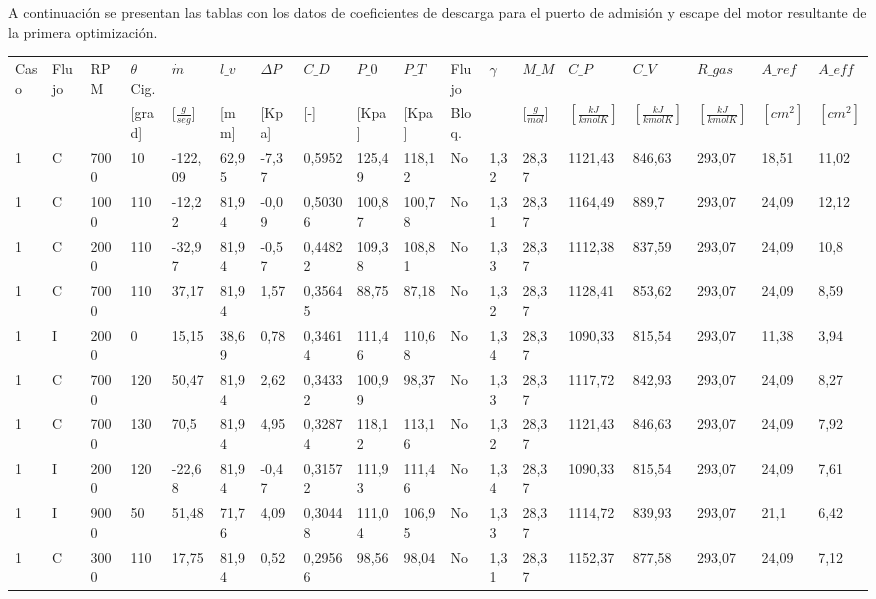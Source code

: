 \label{anexo:1}
A continuación se presentan las tablas con los datos de coeficientes de descarga
para el puerto de admisión y escape del motor resultante de la primera
optimización.

{\tiny
\begin{landscape}
    \begin{longtable}{llllllllllllllllll} \toprule
    Caso & Flujo & RPM & $\theta$ Cig. & $\dot{m}$ & $l\_v$ & $\Delta P$ & $C\_D$ & $P\_0$ & $P\_T$ & Flujo & $\gamma$ & $M\_M$ & $C\_P$ & $C\_V$ & $R\_{gas}$ & $A\_{ref}$ & $A\_{eff}$ \\
     &  &  & [grad] & [$\frac{g}{seg}$] & [mm] & [Kpa] & [-] & [Kpa] & [Kpa] & Bloq. &  & [$\frac{g}{mol}$] & $[\frac{kJ}{kmol K}]$ & $[\frac{kJ}{kmol K}]$ & $[\frac{kJ}{kmol K}]$ & $[cm^2]$ & $[cm^2]$ \\ \midrule
    1 & C & 7000 & 10 & -122,09 & 62,95 & -7,37 & 0,5952 & 125,49 & 118,12 & No & 1,32 & 28,37 & 1121,43 & 846,63 & 293,07 & 18,51 & 11,02 \\
    1 & C & 1000 & 110 & -12,22 & 81,94 & -0,09 & 0,50306 & 100,87 & 100,78 & No & 1,31 & 28,37 & 1164,49 & 889,7 & 293,07 & 24,09 & 12,12 \\
    1 & C & 2000 & 110 & -32,97 & 81,94 & -0,57 & 0,44822 & 109,38 & 108,81 & No & 1,33 & 28,37 & 1112,38 & 837,59 & 293,07 & 24,09 & 10,8 \\
    1 & C & 7000 & 110 & 37,17 & 81,94 & 1,57 & 0,35645 & 88,75 & 87,18 & No & 1,32 & 28,37 & 1128,41 & 853,62 & 293,07 & 24,09 & 8,59 \\
    1 & I & 2000 & 0 & 15,15 & 38,69 & 0,78 & 0,34614 & 111,46 & 110,68 & No & 1,34 & 28,37 & 1090,33 & 815,54 & 293,07 & 11,38 & 3,94 \\
    1 & C & 7000 & 120 & 50,47 & 81,94 & 2,62 & 0,34332 & 100,99 & 98,37 & No & 1,33 & 28,37 & 1117,72 & 842,93 & 293,07 & 24,09 & 8,27 \\
    1 & C & 7000 & 130 & 70,5 & 81,94 & 4,95 & 0,32874 & 118,12 & 113,16 & No & 1,32 & 28,37 & 1121,43 & 846,63 & 293,07 & 24,09 & 7,92 \\
    1 & I & 2000 & 120 & -22,68 & 81,94 & -0,47 & 0,31572 & 111,93 & 111,46 & No & 1,34 & 28,37 & 1090,33 & 815,54 & 293,07 & 24,09 & 7,61 \\
    1 & I & 9000 & 50 & 51,48 & 71,76 & 4,09 & 0,30448 & 111,04 & 106,95 & No & 1,33 & 28,37 & 1114,72 & 839,93 & 293,07 & 21,1 & 6,42 \\
    1 & C & 3000 & 110 & 17,75 & 81,94 & 0,52 & 0,29566 & 98,56 & 98,04 & No & 1,31 & 28,37 & 1152,37 & 877,58 & 293,07 & 24,09 & 7,12 \\

\end{longtable}
\end{landscape}}
